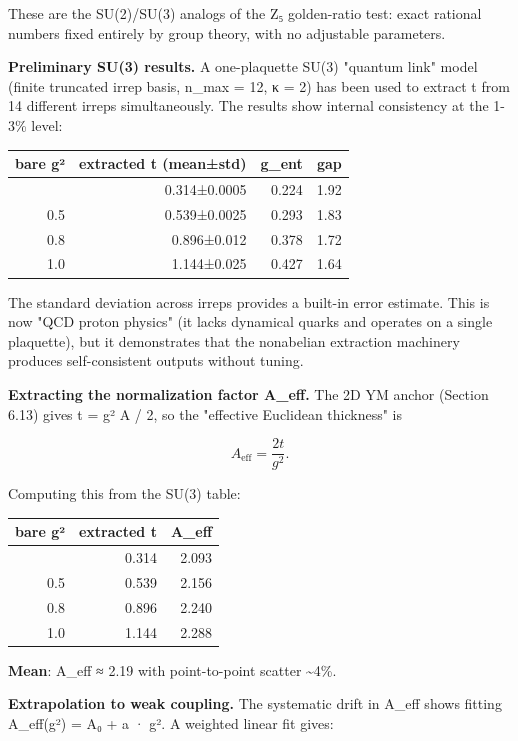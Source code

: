 These are the SU(2)/SU(3) analogs of the Z₅ golden-ratio test: exact rational numbers fixed entirely by group theory, with no adjustable parameters.

\textbf{Preliminary SU(3) results.} A one-plaquette SU(3) "quantum link" model (finite truncated irrep basis, n\_max = 12, κ = 2) has been used to extract t from 14 different irreps simultaneously. The results show internal consistency at the 1-3\% level:

{\def\LTcaptype{none} %
\begin{longtable}[]{@{}rrrr@{}}
\toprule\noalign{}
bare g² & extracted t (mean±std) & g\_ent & gap \\
\midrule\noalign{}
\endhead
\bottomrule\noalign{}
\endlastfoot
0.3 & 0.314±0.0005 & 0.224 & 1.92 \\
0.5 & 0.539±0.0025 & 0.293 & 1.83 \\
0.8 & 0.896±0.012 & 0.378 & 1.72 \\
1.0 & 1.144±0.025 & 0.427 & 1.64 \\
\end{longtable}
}

The standard deviation across irreps provides a built-in error estimate. This is now "QCD proton physics" (it lacks dynamical quarks and operates on a single plaquette), but it demonstrates that the nonabelian extraction machinery produces self-consistent outputs without tuning.

\textbf{Extracting the normalization factor A\_eff.} The 2D YM anchor (Section 6.13) gives t = g² A / 2, so the "effective Euclidean thickness" is

\[
A_\mathrm{eff} = \frac{2t}{g^2}.
\]

Computing this from the SU(3) table:

{\def\LTcaptype{none} %
\begin{longtable}[]{@{}rrr@{}}
\toprule\noalign{}
bare g² & extracted t & A\_eff \\
\midrule\noalign{}
\endhead
\bottomrule\noalign{}
\endlastfoot
0.3 & 0.314 & 2.093 \\
0.5 & 0.539 & 2.156 \\
0.8 & 0.896 & 2.240 \\
1.0 & 1.144 & 2.288 \\
\end{longtable}
}

\textbf{Mean}: A\_eff ≈ 2.19 with point-to-point scatter \textasciitilde4\%.

\textbf{Extrapolation to weak coupling.} The systematic drift in A\_eff shows fitting A\_eff(g²) = A₀ + a · g². A weighted linear fit gives:

